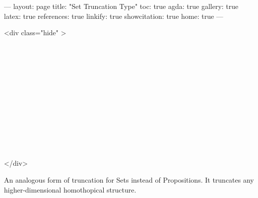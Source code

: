 ---
layout: page
title: "Set Truncation Type"
toc: true
agda: true
gallery: true
latex: true
references: true
linkify: true
showcitation: true
home: true
---

<div class="hide" >
\begin{code}%
\>[0]\AgdaSymbol{\{-\#}\AgdaSpace{}%
\AgdaSpace{}%
\AgdaSpace{}%
\AgdaSymbol{\#-\}}\<%
\\
\>[0]\AgdaSpace{}%
\AgdaSpace{}%
\<%
\\
\>[0]\AgdaSpace{}%
\AgdaSpace{}%
\<%
\\
%
\\[\AgdaEmptyExtraSkip]%
\>[0]\AgdaSpace{}%
\AgdaSpace{}%
\<%
\\
\>[0]\AgdaSpace{}%
\AgdaSpace{}%
\<%
\\
\>[0]\AgdaSpace{}%
\AgdaSpace{}%
\<%
\\
\>[0]\AgdaSpace{}%
\AgdaSpace{}%
\<%
\\
\>[0]\AgdaSpace{}%
\AgdaSpace{}%
\<%
\\
\>[0]\AgdaSpace{}%
\AgdaSpace{}%
\<%
\\
\>[0]\AgdaSpace{}%
\AgdaSpace{}%
\<%
\\
\>[0]\AgdaSpace{}%
\AgdaSpace{}%
\<%
\end{code}
</div>

An analogous form of truncation for Sets instead of
Propositions. It truncates any higher-dimensional homothopical
structure.

